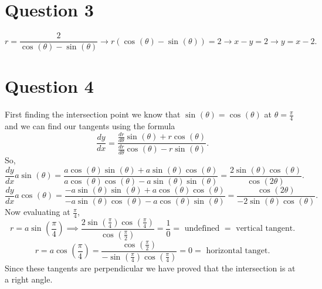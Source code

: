 \documentclass{report}
\begin{document}
\section{Question 3}%
\label{sec:Question 3}
\[
r = \frac{ 2 }{ \cos^{  } \left( \theta \right) -\sin^{  } \left( \theta \right)  } \to r\left( \cos^{  } \left( \theta \right) -\sin^{  } \left( \theta \right)  \right) = 2 \to x - y = 2 \to y = x-2
.\] 
\newpage
\section{Question 4}%
\label{sec:Question 4}
First finding the intersection point we know that $ \sin^{  } \left( \theta \right) =\cos^{  } \left( \theta \right)  $ at $ \theta= \frac{ \pi }{ 4 }  $ and we can find our tangents using the formula 
\[
\frac{ dy }{ dx } = \frac{ \frac{ dr }{ d\theta }\sin^{  } \left( \theta \right) +r\cos^{  } \left( \theta \right)  }{ \frac{ dr }{ d\theta }\cos^{  } \left( \theta \right) -r\sin^{  } \left( \theta \right)  }
.\] 
So,
\[
\frac{ dy }{ dx } a\sin^{  } \left( \theta \right)  = \frac{ a\cos^{  } \left( \theta \right) \sin^{  } \left( \theta \right) +a\sin^{  } \left( \theta \right) \cos^{  } \left( \theta \right)  }{ a\cos^{  } \left( \theta \right) \cos^{  } \left( \theta \right) -a\sin^{   } \left( \theta \right)  \sin^{  } \left( \theta \right)} = \frac{ 2\sin^{  } \left( \theta \right) \cos^{  } \left( \theta \right)  }{ \cos^{  } \left( 2\theta \right)  }
.\] 
\[
\frac{ dy }{ dx } a\cos^{  } \left( \theta \right) = \frac{ -a\sin^{  } \left( \theta \right) \sin^{  } \left( \theta \right) +a\cos^{  } \left( \theta \right) \cos^{  } \left( \theta \right)  }{ -a\sin^{  } \left( \theta \right) \cos^{  } \left( \theta \right) -a\cos^{  } \left( \theta \right) \sin^{  } \left( \theta \right)  }= \frac{ \cos^{  } \left( 2\theta \right)  }{ -2\sin^{  } \left( \theta \right) \cos^{  } \left( \theta \right)  }
.\] 
Now evaluating at $ \frac{ \pi }{ 4 }  $, 
\[
r=a\sin^{  } \left( \frac{ \pi }{ 4 } \right) \implies \frac{ 2\sin^{  } \left( \frac{ \pi }{ 4 }  \right) \cos^{  } \left( \frac{ \pi }{ 4 }  \right)  }{ \cos^{  } \left( \frac{ \pi }{ 2 }  \right)  }= \frac{ 1 }{ 0 } = \text{ undefined } = \text{ vertical tangent}
.\] 
\[
r=a\cos^{  } \left( \frac{ \pi }{ 4 } \right) = \frac{ \cos^{  } \left( \frac{ \pi }{ 2 }  \right)  }{ -\sin^{  } \left( \frac{ \pi }{ 4 }  \right) \cos^{  } \left( \frac{ \pi }{ 4 }  \right)  }= 0 = \text{ horizontal tanget}
.\] 
Since these tangents are perpendicular we have proved that the intersection is at a right angle.
\end{document}
